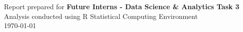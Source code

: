 \documentclass[11pt,a4paper]{article}
\begin{document}
\vspace{1cm}

\begin{center}

\vspace{6pt}

{\color{primary}\small Report prepared for \textbf{Future Interns - Data Science \& Analytics Task 3}}\\[4pt]
{\color{primary}\small Analysis conducted using R Statistical Computing Environment}\\[4pt]
{\color{primary}\small \today}
\end{center}
\end{document}
